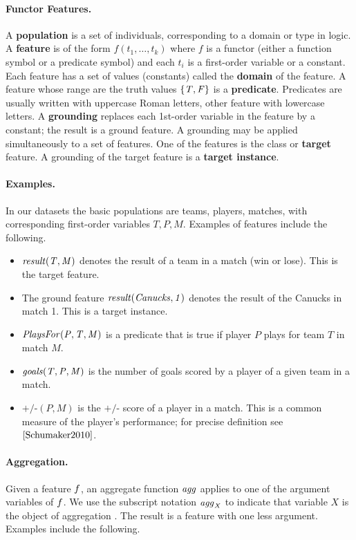 \documentclass[oribibl]{llncs}%
\newcommand{\team}{T}
\newcommand{\player}{P}
\newcommand{\match}{M}
\newcommand{\plusminus}{\mbox{+/-}}
\newcommand{\aggregate}{\it{agg}}
\begin{document}
\paragraph{Functor Features.}
A \textbf{population} is a set of individuals, corresponding to a domain or type in logic. A \textbf{feature} is of the form $f(t_{1},\ldots,t_{k})$ where $f$ is a functor (either a function symbol or a predicate symbol) and each $t_{i}$ is a first-order variable or a constant. Each feature has a set of values (constants) called the \textbf{domain} of the feature. 
A feature whose range are the truth values $\{\mathit{T},\mathit{F}\}$ is a \textbf{predicate}. 
Predicates are usually written with uppercase Roman letters, other feature with lowercase letters.
A \textbf{grounding} replaces each 1st-order variable in the feature by a constant; the result is a ground feature. A grounding may be applied simultaneously to a set of features. One of the features is the class or \textbf{target} feature. A grounding of the target feature is a \textbf{target instance}.

\paragraph{Examples.} In our datasets the basic populations are teams, players, matches, with corresponding first-order variables $\team, \player, \match$. Examples of features include the following.

\begin{itemize}
\item $\it{result}(\team,\match)$ denotes the result of a team in a match (win or lose). This is the target feature.
\item The ground feature $\it{result}(Canucks,1)$ denotes the result of the Canucks in match 1. This is a target instance.
\item $\it{PlaysFor}(\player,\team,\match)$ is a predicate that is true if player $\player$ plays for team $\team$ in match $\match$.
\item $\it{goals}(\team,\player,\match)$ is the number of goals scored by a player of a given team in a match.
\item $\plusminus(\player,\match)$ is the $\plusminus$ score of a player in a match. This is a  common measure of the player's performance; for precise definition see $\cite{Schumaker2010}$.
\end{itemize}

\paragraph{Aggregation.} Given a feature $f$, an aggregate function $\aggregate$ applies to one of the argument variables of $f$. We use the subscript notation $\aggregate_{X}$ to indicate that variable $X$ is the object of aggregation \cite{Popescul2007}. The result is a feature with one less argument. Examples include the following.
\end{document}
